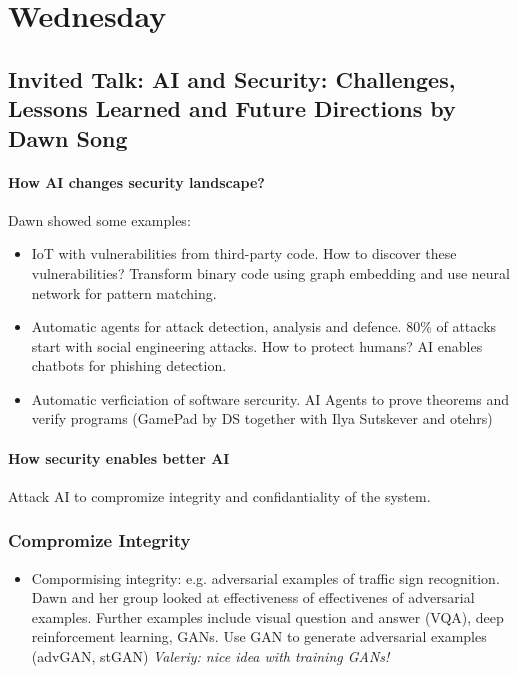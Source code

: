\documentclass[11pt,oneside,a4paper]{scrartcl}
\newcommand{\valeriy}[1]{{\color{blue}\textit{Valeriy: #1}}}
\begin{document}
\section{Wednesday}
\label{sec:wednesday}

\subsection{Invited Talk: AI and Security: Challenges, Lessons Learned
and Future Directions by Dawn Song}
\label{sec:invited-ai-security}


\paragraph{How AI changes security landscape?}

Dawn showed some examples:
\begin{itemize}
\item IoT with vulnerabilities from third-party code. How to discover
  these vulnerabilities? Transform binary code using graph embedding
  and use neural network for pattern matching. 
\item Automatic agents for attack detection, analysis and
  defence. 80\% of attacks start with social engineering attacks. How
  to protect humans? AI enables chatbots for phishing detection.
  
\item Automatic verficiation of software sercurity. AI Agents to prove
  theorems and verify programs (GamePad by DS together with Ilya
  Sutskever and otehrs)
\end{itemize}

\paragraph{How security enables better AI}


Attack AI to compromize integrity and confidantiality of the system.

\subsubsection{Compromize Integrity}
\label{sec:compromize-integrity}



\begin{itemize}
\item Compormising integrity: e.g. adversarial examples of traffic
  sign recognition. Dawn and her group looked at effectiveness of
  effectivenes of adversarial examples. Further examples include
  visual question and answer (VQA), deep reinforcement learning,
  GANs. Use GAN to generate adversarial examples (advGAN, stGAN)
  \valeriy{nice idea with training GANs!}
\end{itemize}
\end{document}
